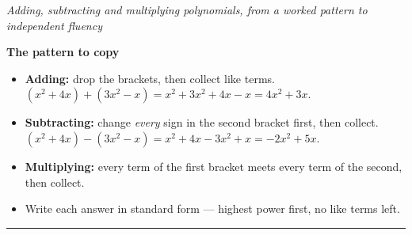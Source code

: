 \documentclass[12pt]{article}
\begin{document}

\begin{center}
\textit{Adding, subtracting and multiplying polynomials, from a worked pattern to independent fluency}
\end{center}

\vspace{0.1cm}
\noindent\textbf{The pattern to copy}
\begin{itemize}[leftmargin=0.9cm, itemsep=1pt, topsep=2pt]
  \item \textbf{Adding:} drop the brackets, then collect like terms.
        $(x^2 + 4x) + (3x^2 - x) = x^2 + 3x^2 + 4x - x = 4x^2 + 3x$.
  \item \textbf{Subtracting:} change \emph{every} sign in the second bracket first, then collect.
        $(x^2 + 4x) - (3x^2 - x) = x^2 + 4x - 3x^2 + x = -2x^2 + 5x$.
  \item \textbf{Multiplying:} every term of the first bracket meets every term of the second, then collect.
  \item Write each answer in standard form --- highest power first, no like terms left.
\end{itemize}

\vspace{0.15cm}
\noindent\rule{\linewidth}{0.4pt}









\end{document}
